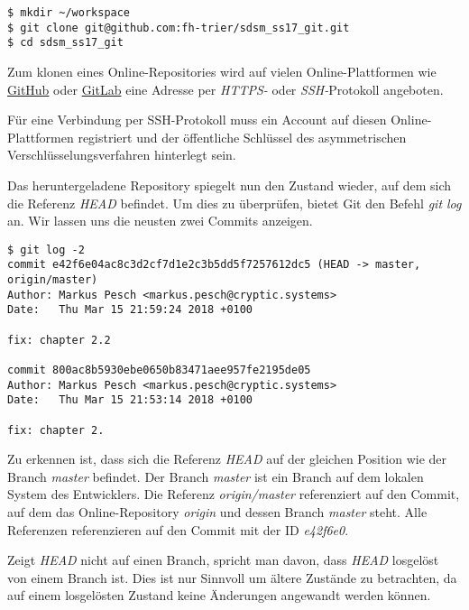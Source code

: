 \begin{verbatim}
$ mkdir ~/workspace
$ git clone git@github.com:fh-trier/sdsm_ss17_git.git
$ cd sdsm_ss17_git
\end{verbatim}

\begin{INFO}
  Zum klonen eines Online-Repositories wird auf vielen Online-Plattformen wie \href{https://github.com}{GitHub} oder \href{https://gitlab.com}{GitLab} eine Adresse per \textit{HTTPS-} oder \textit{SSH-}Protokoll angeboten. 
  
  Für eine Verbindung per SSH-Protokoll muss ein Account auf diesen Online-Plattformen registriert und der öffentliche Schlüssel des asymmetrischen Verschlüsselungsverfahren hinterlegt sein.  
\end{INFO}

Das heruntergeladene Repository spiegelt nun den Zustand wieder, auf dem sich die Referenz \textit{HEAD} befindet. Um dies zu überprüfen, bietet Git den Befehl \textit{git log} an. Wir lassen uns die neusten zwei Commits anzeigen.

\begin{verbatim}
$ git log -2
commit e42f6e04ac8c3d2cf7d1e2c3b5dd5f7257612dc5 (HEAD -> master, origin/master)
Author: Markus Pesch <markus.pesch@cryptic.systems>
Date:   Thu Mar 15 21:59:24 2018 +0100

fix: chapter 2.2

commit 800ac8b5930ebe0650b83471aee957fe2195de05
Author: Markus Pesch <markus.pesch@cryptic.systems>
Date:   Thu Mar 15 21:53:14 2018 +0100

fix: chapter 2.
\end{verbatim}

Zu erkennen ist, dass sich die Referenz \textit{HEAD} auf der gleichen Position wie der Branch \textit{master} befindet. Der Branch \textit{master} ist ein Branch auf dem lokalen System des Entwicklers. Die Referenz \textit{origin/master} referenziert auf den Commit, auf dem das Online-Repository \textit{origin} und dessen Branch \textit{master} steht. Alle Referenzen referenzieren auf den Commit mit der ID \textit{e42f6e0}.

\begin{WARN}
  Zeigt \textit{HEAD} nicht auf einen Branch, spricht man davon, dass \textit{HEAD} losgelöst von einem Branch ist. Dies ist nur Sinnvoll um ältere Zustände zu betrachten, da auf einem losgelösten Zustand keine Änderungen angewandt werden können.
\end{WARN}

